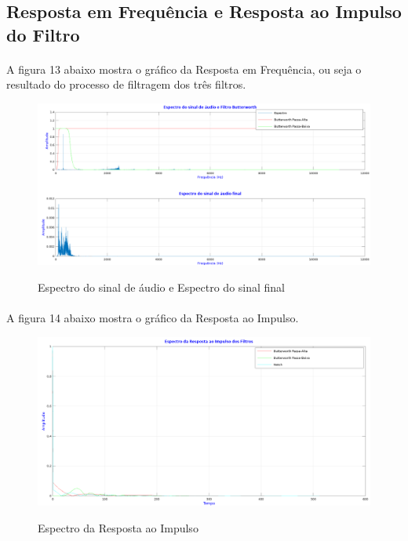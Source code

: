 \documentclass[12pt,fleqn]{article}
\begin{document}
\newpage



\subsection{Resposta em Frequência e Resposta ao Impulso do Filtro}
\paragraph{} A figura 13 abaixo mostra o gráfico da Resposta em Frequência, ou seja o resultado do processo de filtragem dos três filtros.

\begin{figure}[!htb]
    \centering
    \includegraphics[scale=0.4]{fig/sinal3.png}
    \label{figura:figura9}
    \caption{Espectro do sinal de áudio e Espectro do sinal final}
\end{figure}

\newpage

\paragraph{} A figura 14 abaixo mostra o gráfico da Resposta ao Impulso.

\begin{figure}[!htb]
    \centering
    \includegraphics[scale=0.4]{fig/sinal4.png}
    \label{figura:figura10}
    \caption{Espectro da Resposta ao Impulso}
\end{figure}
\end{document}
